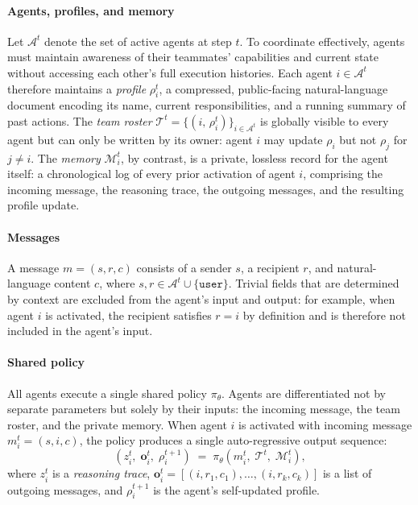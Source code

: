 \documentclass{article} %
\begin{document}
\paragraph{Agents, profiles, and memory}
Let $\mathcal{A}^t$ denote the set of active agents at step $t$.
To coordinate effectively, agents must maintain awareness of their teammates'
capabilities and current state without accessing each other's full execution histories.
Each agent $i \in \mathcal{A}^t$ therefore maintains a \emph{profile}
$\rho_i^t$, a compressed, public-facing natural-language document encoding its name,
current responsibilities, and a running summary of past actions.
The \emph{team roster} $\mathcal{T}^t = \{(i,\,\rho_i^t)\}_{i \in \mathcal{A}^t}$
is globally visible to every agent but can only be written by its owner:
agent $i$ may update $\rho_i$ but not $\rho_j$ for $j \neq i$.
The \emph{memory} $\mathcal{M}_i^t$, by contrast, is a private, lossless record
for the agent itself: a chronological log of every prior activation of agent $i$,
comprising the incoming message, the reasoning trace, the outgoing messages,
and the resulting profile update.

\paragraph{Messages}
A message $m = (s, r, c)$ consists of a sender $s$, a recipient $r$, and
natural-language content $c$,
where $s, r \in \mathcal{A}^t \cup \{\texttt{user}\}$.
Trivial fields that are determined by context are excluded from the agent's
input and output: for example, when agent $i$ is activated, the recipient
satisfies $r = i$ by definition and is therefore not included in the agent's input.

\paragraph{Shared policy}
All agents execute a single shared policy $\pi_\theta$.
Agents are differentiated not by separate parameters but solely by their
inputs: the incoming message, the team roster, and the private memory.
When agent $i$ is activated with incoming message $m_i^t = (s, i, c)$, the policy
produces a single auto-regressive output sequence:
\begin{equation}
    (z_i^t,\;\mathbf{o}_i^t,\;\rho_i^{t+1})
    \;=\;
    \pi_\theta\!\left(m_i^t,\;\mathcal{T}^t,\;\mathcal{M}_i^t\right),
    \label{eq:policy}
\end{equation}
where $z_i^t$ is a \emph{reasoning trace},
$\mathbf{o}_i^t = [(i,r_1,c_1),\ldots,(i,r_k,c_k)]$ is a list of outgoing messages,
and $\rho_i^{t+1}$ is the agent's self-updated profile.
\end{document}
